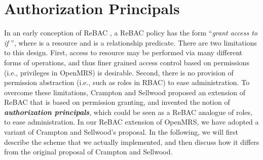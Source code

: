 \documentclass{acm_proc_article-sp}
\newcommand{\Dfn}[1]{\textbf{\emph{#1}}}
\newcommand{\ToDo}[1]{\emph{[\textbf{To Do:} #1]}}
\begin{document}
\begin{comment}
\ToDo{
Pending revisions:
\begin{enumerate}
\item In the second paragraph where you mention the ``Context'' being
  passed as an argument for the ReBAC authorization advice, is
  actually incorrect. The ``Context'' class contains public static
  methods, that are accessible by every class.
\item In the second paragraph where you mention that the identity of
  the service layer method being invoked is provided by the ``Context'',
  is also incorrect. The advice contains a method called invoke which
  gets an argument of type ``MethodInvocation.'' The method being
  invoked is identified through this argument.
\begin{itemize}
\item the arguments of the invoked method is also contained in
  ``MethodInvocation''
\end{itemize}
\item When you discuss ``setter'' and ``getter'' method, you mention
  that in OpenMRS there is no way to identify if a method is a setter
  or a getter. This is also incorrect. OpenMRS actually uses method
  naming conventions for setter and getter methods. This is a built in
  mechanism in OpenMRS used for logging purposes.
\end{enumerate}
}
\end{comment}




\section{Authorization Principals}
\label{sec-auth-prin}


In an early conception of ReBAC \cite{Bruns-etal:2012}, a ReBAC policy
has the form ``\emph{grant access to  if }'', where
 is a resource and  is a relationship predicate.
There are two limitations to this design. First, access to resource
 may be performed via many different forms of operations, and thus
finer grained access control based on permissions (i.e., privileges in
OpenMRS) is desirable. Second, there is no provision of permission
abstraction (i.e., such as roles in RBAC) to ease administration.  To
overcome these limitations, Crampton and Sellwood
\cite{Crampton-Sellwood:2014} proposed an extension of ReBAC that is
based on permission granting, and invented the notion of
\Dfn{authorization principals}, which could be seen as a ReBAC
analogue of roles, to ease administration.  In our ReBAC extension of
OpenMRS, we have adopted a variant of Crampton and Sellwood's
proposal.  In the following, we will first describe the scheme that we
actually implemented, and then discuss how it differs from the
original proposal of Crampton and Sellwood.
\end{document}
